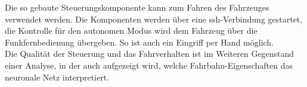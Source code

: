 Die so gebaute Steuerungskomponente kann zum Fahren des Fahrzeuges verwendet werden. Die Komponenten werden über eine ssh-Verbindung gestartet, die Kontrolle für den autonomen Modus wird dem Fahrzeug über die Funkfernbedienung übergeben. So ist auch ein Eingriff per Hand möglich.\\
Die Qualität der Steuerung und das Fahrverhalten ist im Weiteren Gegenstand einer Analyse, in der auch aufgezeigt wird, welche Fahrbahn-Eigenschaften das neuronale Netz interpretiert.



